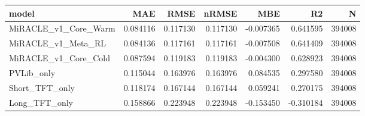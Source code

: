 \begin{tabular}{lrrrrrr}
\toprule
model & MAE & RMSE & nRMSE & MBE & R2 & N \\
\midrule
MiRACLE_v1_Core_Warm & 0.084116 & 0.117130 & 0.117130 & -0.007365 & 0.641595 & 394008 \\
MiRACLE_v1_Meta_RL & 0.084136 & 0.117161 & 0.117161 & -0.007508 & 0.641409 & 394008 \\
MiRACLE_v1_Core_Cold & 0.087594 & 0.119183 & 0.119183 & -0.004300 & 0.628923 & 394008 \\
PVLib_only & 0.115044 & 0.163976 & 0.163976 & 0.084535 & 0.297580 & 394008 \\
Short_TFT_only & 0.118174 & 0.167144 & 0.167144 & 0.059241 & 0.270175 & 394008 \\
Long_TFT_only & 0.158866 & 0.223948 & 0.223948 & -0.153450 & -0.310184 & 394008 \\
\bottomrule
\end{tabular}
